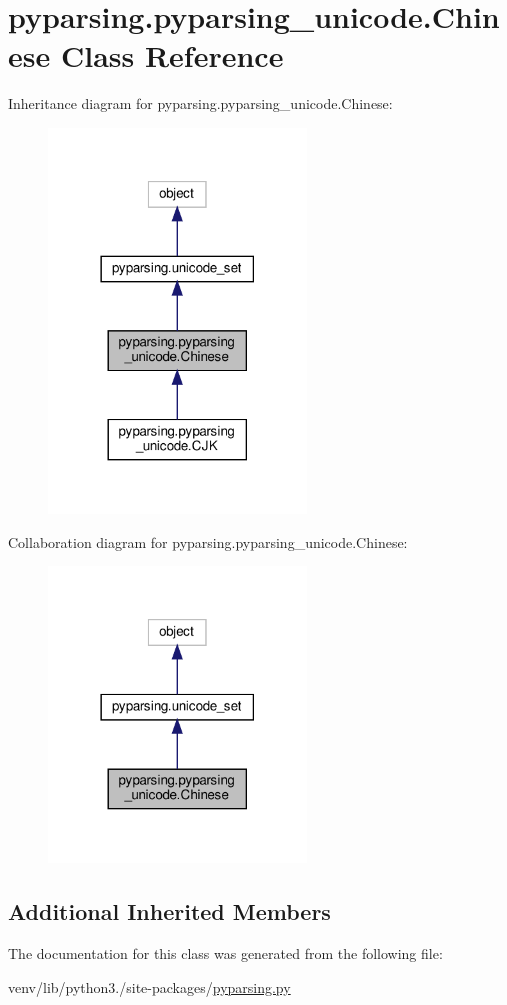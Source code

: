 \hypertarget{classpyparsing_1_1pyparsing__unicode_1_1Chinese}{}\section{pyparsing.\+pyparsing\+\_\+unicode.\+Chinese Class Reference}
\label{classpyparsing_1_1pyparsing__unicode_1_1Chinese}


Inheritance diagram for pyparsing.\+pyparsing\+\_\+unicode.\+Chinese\+:
\nopagebreak
\begin{figure}[H]
\begin{center}
\leavevmode
\includegraphics[width=194pt]{classpyparsing_1_1pyparsing__unicode_1_1Chinese__inherit__graph}
\end{center}
\end{figure}


Collaboration diagram for pyparsing.\+pyparsing\+\_\+unicode.\+Chinese\+:
\nopagebreak
\begin{figure}[H]
\begin{center}
\leavevmode
\includegraphics[width=194pt]{classpyparsing_1_1pyparsing__unicode_1_1Chinese__coll__graph}
\end{center}
\end{figure}
\subsection*{Additional Inherited Members}


The documentation for this class was generated from the following file\+:\begin{DoxyCompactItemize}
\item 
venv/lib/python3./site-\/packages/\hyperlink{pyparsing_8py}{pyparsing.\+py}\end{DoxyCompactItemize}
